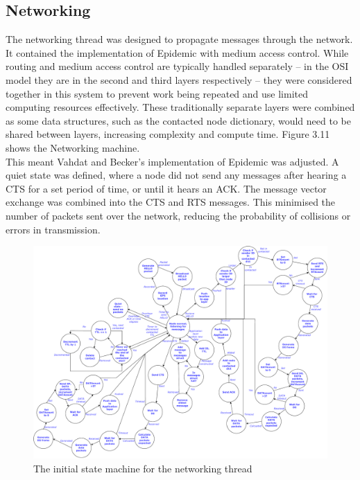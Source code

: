 \documentclass[12pt,a4paper]{report}
\begin{document}
\subsection{Networking}
The networking thread was designed to propagate messages through the network. It contained the implementation of Epidemic with medium access control. While routing and medium access control are typically handled separately -- in the OSI model they are in the second and third layers respectively -- they were considered together in this system to prevent work being repeated and use limited computing resources effectively. These traditionally separate layers were combined as some data structures, such as the contacted node dictionary, would need to be shared between layers, increasing complexity and compute time. Figure 3.11 shows the Networking machine. \\
This meant Vahdat and Becker's implementation of Epidemic was adjusted. A quiet state was defined, where a node did not send any messages after hearing a CTS for a set period of time, or until it hears an ACK. The message vector exchange was combined into the CTS and RTS messages. This minimised the number of packets sent over the network, reducing the probability of collisions or errors in transmission.
\begin{figure}[h]
\begin{center}
\includegraphics[scale=0.4]{appLayer.pdf}
\end{center}
\caption{The initial state machine for the networking thread}
\end{figure}
\FloatBarrier
\end{document}
